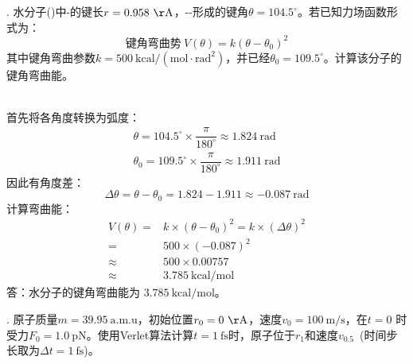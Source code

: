 {. 水分子()中-的键长$r=0.958~\mathrm{\AA}$，--形成的键角$\theta=104.5^{\circ}$。若已知力场函数形式为：
\begin{displaymath}
	\mbox{键角弯曲势}~V(\theta)=k(\theta−\theta_0)^2
\end{displaymath}
其中键角弯曲参数$k=500~\mathrm{kcal}/(\mathrm{mol}\cdot\mathrm{rad}^2)$，并已经$\theta_0=109.5^{\circ}$。计算该分子的键角弯曲能。}

\\
    首先将各角度转换为弧度：
    \begin{displaymath}
	    \begin{aligned}
	    \theta=104.5^{\circ}\times\dfrac{\pi}{180^{\circ}}\approx1.824~\mathrm{rad}\\
	    \theta_0=109.5^{\circ}\times\dfrac{\pi}{180^{\circ}}\approx1.911~\mathrm{rad} 
	    \end{aligned}
    \end{displaymath}
    因此有角度差：
    \begin{displaymath}
	    \Delta\theta=\theta−\theta_0=1.824−1.911\approx−0.087~\mathrm{rad}
    \end{displaymath}
    计算弯曲能：
    \begin{displaymath}
	    \begin{aligned}
		    V(\theta)=&k\times(\theta-\theta_0)^2=k\times(\Delta\theta)^2\\
		    =&500\times(−0.087)^2\\
		    \approx&500\times0.00757\\
		    \approx&3.785~\mathrm{kcal/mol}
	    \end{aligned}
    \end{displaymath}
{\heiti 答}：水分子的键角弯曲能为 $3.785~\mathrm{kcal/mol}$。

    {. 原子质量$m=39.95~\mathrm{a.m.u}$，初始位置$r_0=0~\mathrm{\AA}$，速度$v_0=100~\mathrm{m/s}$，在$t=0$ 时受力$F_0=1.0~\mathrm{pN}$。使用\textrm{Verlet}算法计算$t=1~\mathrm{fs}$时，原子位于$r_1$和速度$v_{0.5}$~(时间步长取为$\Delta t=1~\mathrm{fs}$)。}

